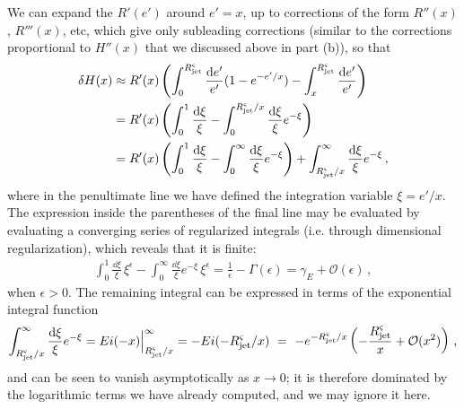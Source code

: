 \begin{enumerate}[label=\alph*)]
        We can expand the \(R'(e')\) around \(e' = x\), up to corrections of the form \(R''(x)\), \(R'''(x)\), etc, which give only subleading corrections (similar to the corrections proportional to \(H''(x)\) that we discussed above in part (b)), so that
        \begin{align}
            \delta H(x)
            &\approx
            R'(x)
            \left(
                \int_0^{R_\text{jet}^\varsigma}
                \frac{\dd e'}{e'}
                (1 - e^{-e'/x})
                -
                \int_x^{R_\text{jet}^\varsigma}
                \frac{\dd e'}{e'}
            \right)
            \\
            &=
            R'(x) \left(
                \int_0^1 \frac{\dd \xi}{\xi}
                -
                \int_0^{R_\text{jet}^\varsigma/x}
                \frac{\dd\xi}{\xi} e^{-\xi}
            \right)
            \\
            &=
            R'(x) \left(
                \int_0^1 \frac{\dd \xi}{\xi}
                -
                \int_0^{\infty}
                \frac{\dd\xi}{\xi} e^{-\xi}
            \right)
            +
            \int_{R_\text{jet}^\varsigma/x}^{\infty}
            \frac{\dd\xi}{\xi} e^{-\xi}
            \,,
        \end{align}
        where in the penultimate line we have defined the integration variable \(\xi = e' / x\).
        The expression inside the parentheses of the final line may be evaluated by evaluating a converging series of regularized integrals (i.e. through dimensional regularization), which reveals that it is finite:
        \begin{align}
            \int_0^1 \frac{\dd \xi}{\xi} \, \xi^\epsilon
            -
            \int_0^{\infty}
            \frac{\dd\xi}{\xi} e^{-\xi}\, \xi^\epsilon
            =
            \frac{1}{\epsilon} - \Gamma(\epsilon)
            =
            \gamma_E + \mathcal{O}(\epsilon)
            \,,
        \end{align}
        when \(\epsilon > 0\).
        The remaining integral can be expressed in terms of the exponential integral function
        \begin{align}
            \int_{R_\text{jet}^\varsigma/x}^{\infty}
            \frac{\dd\xi}{\xi} e^{-\xi}
            =
            Ei(-x) \Big|_{R_\text{jet}^\varsigma/x}^{\infty}
            =
            -Ei(-R_\text{jet}^\varsigma/x)
            \,\,
            =
            \,\,
            -e^{-R_\text{jet}^\varsigma/x}
            \left(
                -\frac{R_\text{jet}^\varsigma}{x} + \mathcal{O}(x^2)
            \right)
            \,,
        \end{align}
        and can be seen to vanish asymptotically as \(x \to 0\);
        it is therefore dominated by the logarithmic terms we have already computed, and we may ignore it here.


\end{enumerate}
